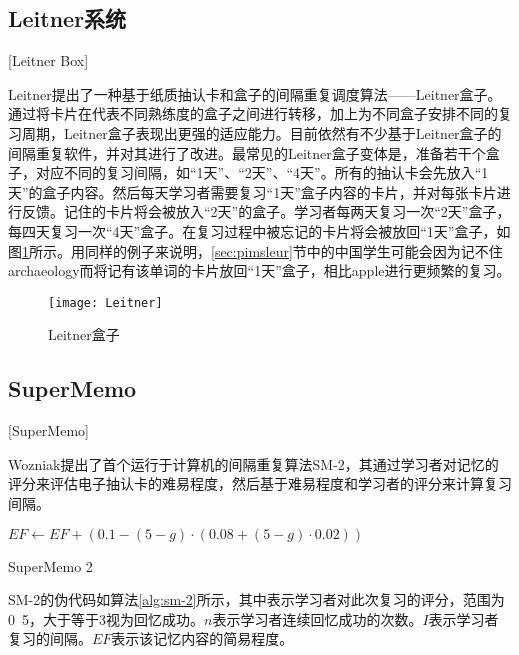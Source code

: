 \subsection{Leitner系统}[Leitner Box]

Leitner提出了一种基于纸质抽认卡和盒子的间隔重复调度算法——Leitner盒子\cite{leitnerLerntManLeben1974}。通过将卡片在代表不同熟练度的盒子之间进行转移，加上为不同盒子安排不同的复习周期，Leitner盒子表现出更强的适应能力。目前依然有不少基于Leitner盒子的间隔重复软件，并对其进行了改进。最常见的Leitner盒子变体是，准备若干个盒子，对应不同的复习间隔，如“1天”、“2天”、“4天”。所有的抽认卡会先放入“1天”的盒子内容。然后每天学习者需要复习“1天”盒子内容的卡片，并对每张卡片进行反馈。记住的卡片将会被放入“2天”的盒子。学习者每两天复习一次“2天”盒子，每四天复习一次“4天”盒子。在复习过程中被忘记的卡片将会被放回“1天”盒子，如图\ref{fig:leitner}所示。用同样的例子来说明，\ref{sec:pimsleur}节中的中国学生可能会因为记不住archaeology而将记有该单词的卡片放回“1天”盒子，相比apple进行更频繁的复习。

\begin{figure}[htbp]
    \centering
    \texttt{[image: Leitner]}
    \caption{Leitner盒子}
    \label{fig:leitner}
\end{figure}

\subsection{SuperMemo}[SuperMemo]

Wozniak提出了首个运行于计算机的间隔重复算法SM-2\cite{wozniakOptimizationLearning1990}，其通过学习者对记忆的评分来评估电子抽认卡的难易程度，然后基于难易程度和学习者的评分来计算复习间隔。

\begin{algorithm}[htbp]
    $EF \leftarrow  EF + (0.1-(5-g)\cdot(0.08+(5-g)\cdot0.02))$\;
\caption{SuperMemo 2}
\label{alg:sm-2}
\end{algorithm}

SM-2的伪代码如算法\ref{alg:sm-2}所示，其中表示学习者对此次复习的评分，范围为0~5，大于等于3视为回忆成功。$n$表示学习者连续回忆成功的次数。$I$表示学习者复习的间隔。$EF$表示该记忆内容的简易程度。

